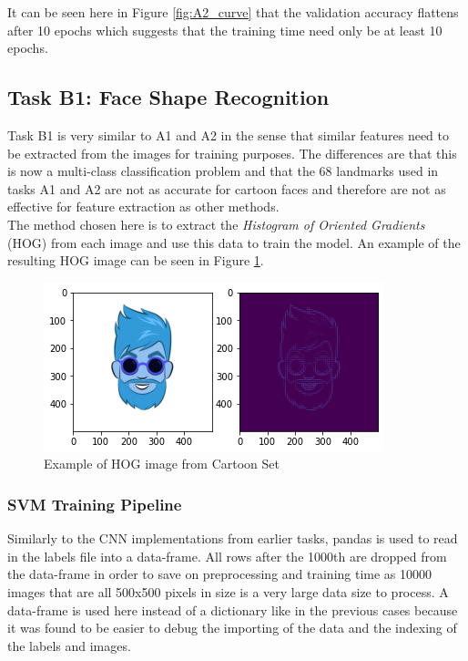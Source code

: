 \documentclass{article}
\begin{document}
	It can be seen here in Figure \ref{fig:A2_curve} that the validation accuracy flattens after 10 epochs which suggests that the training time need only be at least 10 epochs.
    \subsection{Task B1: Face Shape Recognition}
    Task B1 is very similar to A1 and A2 in the sense that similar features need to be extracted from the images for training purposes. The differences are that this is now a multi-class classification problem and that the 68 landmarks used in tasks A1 and A2 are not as accurate for cartoon faces and therefore are not as effective for feature extraction as other methods.\\
    
    The method chosen here is to extract the \textit{Histogram of Oriented Gradients} (HOG) from each image and use this data to train the model. An example of the resulting HOG image can be seen in Figure \ref{fig:hog}.
    \begin{figure}[htb]
    	\centering
    	\includegraphics[scale=0.7]{Figures/Hog_Example.PNG}
    	\caption{Example of HOG image from Cartoon Set}
    	\label{fig:hog}
    \end{figure} 
    
    \subsubsection{SVM Training Pipeline}
    Similarly to the CNN implementations from earlier tasks, pandas is used to read in the labels file into a data-frame. All rows after the 1000th are dropped from the data-frame in order to save on preprocessing and training time as 10000 images that are all 500x500 pixels in size is a very large data size to process. A data-frame is used here instead of a dictionary like in the previous cases because it was found to be easier to debug the importing of the data and the indexing of the labels and images.\\
    
\end{document}
